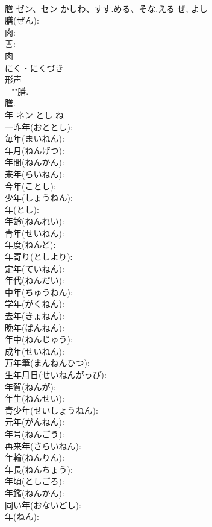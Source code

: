 \documentclass[8pt]{extreport}
\begin{document}
\begin{CJK}{UTF8}{min}
\\	膳	ゼン、セン	かしわ、すす.める、そな.える	ぜ, よし	
\\	膳(ぜん): 
\\	肉: 
\\	善: 
\\	肉	
\\	にく・にくづき	
\\	形声 
\\	=""膳.
\\	膳.
\\	年	ネン	とし	ね	
\\	一昨年(おととし): 
\\	毎年(まいねん): 
\\	年月(ねんげつ): 
\\	年間(ねんかん): 
\\	来年(らいねん): 
\\	今年(ことし): 
\\	少年(しょうねん): 
\\	年(とし): 
\\	年齢(ねんれい): 
\\	青年(せいねん): 
\\	年度(ねんど): 
\\	年寄り(としより): 
\\	定年(ていねん): 
\\	年代(ねんだい): 
\\	中年(ちゅうねん): 
\\	学年(がくねん): 
\\	去年(きょねん): 
\\	晩年(ばんねん): 
\\	年中(ねんじゅう): 
\\	成年(せいねん): 
\\	万年筆(まんねんひつ): 
\\	生年月日(せいねんがっぴ): 
\\	年賀(ねんが): 
\\	年生(ねんせい): 
\\	青少年(せいしょうねん): 
\\	元年(がんねん): 
\\	年号(ねんごう): 
\\	再来年(さらいねん): 
\\	年輪(ねんりん): 
\\	年長(ねんちょう): 
\\	年頃(としごろ): 
\\	年鑑(ねんかん): 
\\	同い年(おないどし): 
\\	年(ねん): 

\end{CJK}
\end{document}
